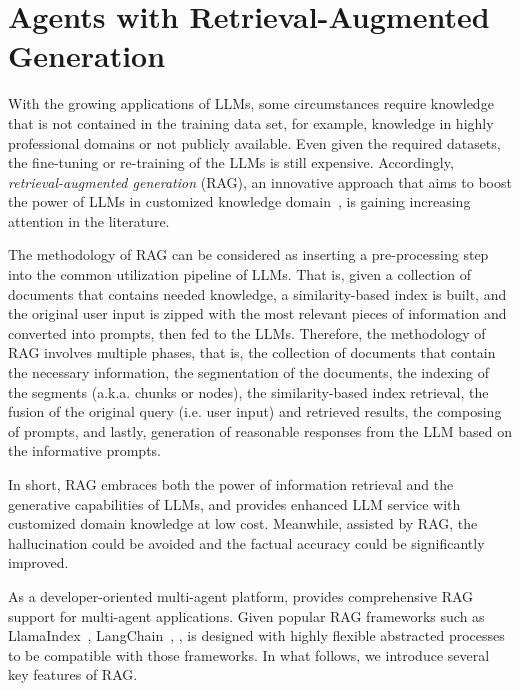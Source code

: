 \section{Agents with Retrieval-Augmented Generation}
\label{sec:rag}

With the growing applications of LLMs, some circumstances require knowledge that is not contained in the training data set, for example, knowledge in highly professional domains or not publicly available. Even given the required datasets, the fine-tuning or re-training of the LLMs is still expensive. Accordingly, \textit{retrieval-augmented generation} (RAG), an innovative approach that aims to boost the power of LLMs in customized knowledge domain~\citep{rag_survey1,rag_survey2}, is gaining increasing attention in the literature.

The methodology of RAG can be considered as inserting a pre-processing step into the common utilization pipeline of LLMs. That is, given a collection of documents that contains needed knowledge, a similarity-based index is built, and the original user input is zipped with the most relevant pieces of information and converted into prompts, then fed to the LLMs. Therefore, the methodology of RAG involves multiple phases, that is, the collection of documents that contain the necessary information, the segmentation of the documents, the indexing of the segments (a.k.a. chunks or nodes), the similarity-based index retrieval, the fusion of the original query (i.e. user input) and retrieved results, the composing of prompts, and lastly, generation of reasonable responses from the LLM based on the informative prompts. 

In short, RAG embraces both the power of information retrieval and the generative capabilities of LLMs, and provides enhanced LLM service with customized domain knowledge at low cost. Meanwhile, assisted by RAG, the hallucination could be avoided and the factual accuracy could be significantly improved. 

As a developer-oriented multi-agent platform, \ours provides comprehensive RAG support for multi-agent applications. 
Given popular RAG frameworks such as \eg LlamaIndex~\citep{llamaindex}, LangChain~\citep{langchain}, \etc, \ours is designed with highly flexible abstracted processes to be compatible with those frameworks. In what follows, we introduce several key features of \ours RAG. 


